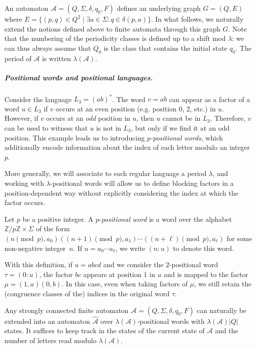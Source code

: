\documentclass[letterpaper, USenglish, cleveref, autoref, thm-restate, numberwithinsect]{lipics-v2021}
\theoremstyle{theorem}
\theoremstyle{definition}
\newcommand{\Aa}{\mathcal{A}}
\newcommand{\timedA}{\widehat{\Aa}}
\newcommand{\timedword}[2]{(#1:#2)}
\newcommand{\ZZ}{\mathbb{Z}}
\begin{document}
An automaton $\Aa = (Q, \Sigma, \delta, q_0, F)$ defines an underlying graph $G = (Q, E)$ where $E= \{(p,q) \in Q^2 \mid \exists a\in\Sigma: q\in\delta(p, a)\}$. 
In what follows, we naturally extend the notions defined above to finite automata through this graph $G$. 
Note that the numbering of the periodicity classes is defined up to a shift mod $\lambda$: we can thus always assume that $Q_0$ is the class that contains the initial state $q_0$.
The period of $\Aa$ is written $\lambda(\Aa)$.

\subparagraph*{Positional words and positional languages.}

Consider the language $L_3 = (ab)^*$.
The word $v = ab$ can appear as a factor of a word $u \in L_3$ if $v$ occurs at an even position (e.g. position 0, 2, etc.) in $u$. However, if $v$ occurs at an \emph{odd} position in $u$, then $u$ cannot be in $L_3$.
Therefore, $v$ can be used to witness that $u$ is not in $L_3$, but only if we find it at an odd position.
This example leads us to introducing \emph{$p$-positional words}, which additionally encode information about the index of each letter modulo an integer $p$.

More generally, we will associate to each regular language a period $\lambda$, and working with $\lambda$-positional words will allow us to define blocking factors in a position-dependent way without explicitly considering the index at which the factor occurs.

\begin{definition}
    Let $p$ be a positive integer.
    A $p$-\emph{positional word} is a word over the alphabet $\ZZ/p\ZZ\times \Sigma$ of the form $(n\pmod{p}, a_0) ((n+1) \pmod{p}, a_1) \cdots ((n+\ell) \pmod{p}, a_\ell)$ for some non-negative integer~$n$.
    If $u= a_0 \cdots a_\ell$, we write $\timedword{n}{u}$ to denote this word.
\end{definition}

With this definition, if $u = abcd$ and we consider the $2$-positional word $\tau = \timedword{0}{u}$, the factor $bc$ appears at position $1$ in $u$ and is mapped to the factor $\mu = (1, a)(0, b)$.
In this case, even when taking factors of $\mu$, we still retain the (congruence classes of the) indices in the original word $\tau$.

Any strongly connected finite automaton $\Aa = (Q, \Sigma, \delta, q_0, F)$ can naturally be extended into an automaton $\timedA$ over $\lambda(\Aa)$-positional words with $\lambda(\Aa)|Q|$ states. It suffices to keep track in the states of the current state of $\Aa$ and the number of letters read modulo $\lambda(\Aa)$.
\end{document}
